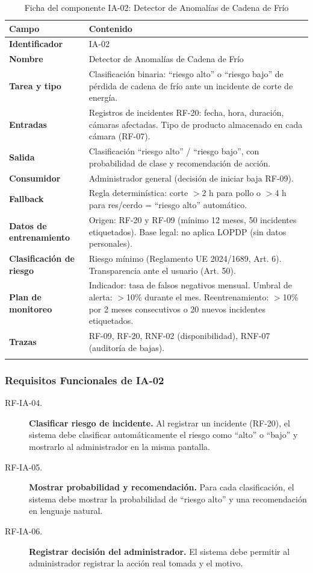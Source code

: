 \documentclass[11pt,a4paper]{article}
\begin{document}
\begin{longtable}{|p{3.5cm}|p{10cm}|}
\hline
\textbf{Campo} & \textbf{Contenido} \\
\hline
\textbf{Identificador} & IA-02 \\
\hline
\textbf{Nombre} & Detector de Anomalías de Cadena de Frío \\
\hline
\textbf{Tarea y tipo} & Clasificación binaria: ``riesgo alto'' o ``riesgo bajo'' de pérdida de cadena de frío ante un incidente de corte de energía. \\
\hline
\textbf{Entradas} & Registros de incidentes RF-20: fecha, hora, duración, cámaras afectadas. Tipo de producto almacenado en cada cámara (RF-07). \\
\hline
\textbf{Salida} & Clasificación ``riesgo alto'' / ``riesgo bajo'', con probabilidad de clase y recomendación de acción. \\
\hline
\textbf{Consumidor} & Administrador general (decisión de iniciar baja RF-09). \\
\hline
\textbf{Fallback} & Regla determinística: corte $>$2 h para pollo o $>$4 h para res/cerdo = ``riesgo alto'' automático. \\
\hline
\textbf{Datos de entrenamiento} & Origen: RF-20 y RF-09 (mínimo 12 meses, 50 incidentes etiquetados). Base legal: no aplica LOPDP (sin datos personales). \\
\hline
\textbf{Clasificación de riesgo} & Riesgo mínimo (Reglamento UE 2024/1689, Art. 6). Transparencia ante el usuario (Art. 50). \\
\hline
\textbf{Plan de monitoreo} & Indicador: tasa de falsos negativos mensual. Umbral de alerta: $>$10\% durante el mes. Reentrenamiento: $>$10\% por 2 meses consecutivos o 20 nuevos incidentes etiquetados. \\
\hline
\textbf{Trazas} & RF-09, RF-20, RNF-02 (disponibilidad), RNF-07 (auditoría de bajas). \\
\hline
\caption{Ficha del componente IA-02: Detector de Anomalías de Cadena de Frío}
\label{tab:ia02}
\end{longtable}

\subsubsection{Requisitos Funcionales de IA-02}

\begin{description}
  \item[RF-IA-04.] \textbf{Clasificar riesgo de incidente.} Al registrar un incidente (RF-20), el sistema debe clasificar automáticamente el riesgo como ``alto'' o ``bajo'' y mostrarlo al administrador en la misma pantalla.
  \item[RF-IA-05.] \textbf{Mostrar probabilidad y recomendación.} Para cada clasificación, el sistema debe mostrar la probabilidad de ``riesgo alto'' y una recomendación en lenguaje natural.
  \item[RF-IA-06.] \textbf{Registrar decisión del administrador.} El sistema debe permitir al administrador registrar la acción real tomada y el motivo.
\end{description}
\end{document}
